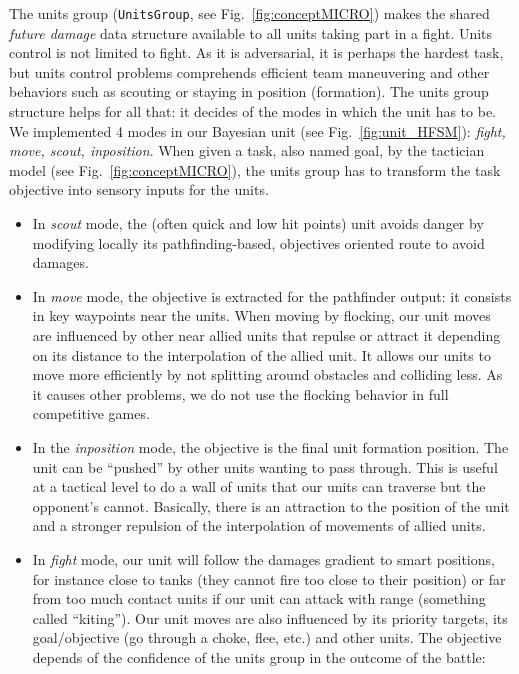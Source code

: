 \label{sec:unitsgroup}
The units group (\texttt{UnitsGroup}, see Fig.~\ref{fig:conceptMICRO}) makes the shared \textit{future damage} data structure available to all units taking part in a fight. Units control is not limited to fight. As it is adversarial, it is perhaps the hardest task, but units control problems comprehends efficient team maneuvering and other behaviors such as scouting or staying in position (formation). The units group structure helps for all that: it decides of the modes in which the unit has to be. We implemented 4 modes in our Bayesian unit (see Fig.~\ref{fig:unit_HFSM}): \textit{fight, move, scout, inposition}. When given a task, also named goal, by the tactician model (see Fig.~\ref{fig:conceptMICRO}), the units group has to transform the task objective into sensory inputs for the units. 
\begin{itemize}
    \item In \textit{scout} mode, the (often quick and low hit points) unit avoids danger by modifying locally its pathfinding-based, objectives oriented route to avoid damages.
    \item In \textit{move} mode, the objective is extracted for the pathfinder output: it consists in key waypoints near the units. When moving by flocking, our unit moves are influenced by other near allied units that repulse or attract it depending on its distance to the interpolation of the allied unit. It allows our units to move more efficiently by not splitting around obstacles and colliding less. As it causes other problems, we do not use the flocking behavior in full competitive games.
    \item In the \textit{inposition} mode, the objective is the final unit formation position. The unit can be ``pushed'' by other units wanting to pass through. This is useful at a tactical level to do a wall of units that our units can traverse but the opponent's cannot. Basically, there is an attraction to the position of the unit and a stronger repulsion of the interpolation of movements of allied units.
    \item In \textit{fight} mode, our unit will follow the damages gradient to smart positions, for instance close to tanks (they cannot fire too close to their position) or far from too much contact units if our unit can attack with range (something called ``kiting''). Our unit moves are also influenced by its priority targets, its goal/objective (go through a choke, flee, etc.) and other units. The objective depends of the confidence of the units group in the outcome of the battle:

\end{itemize}
